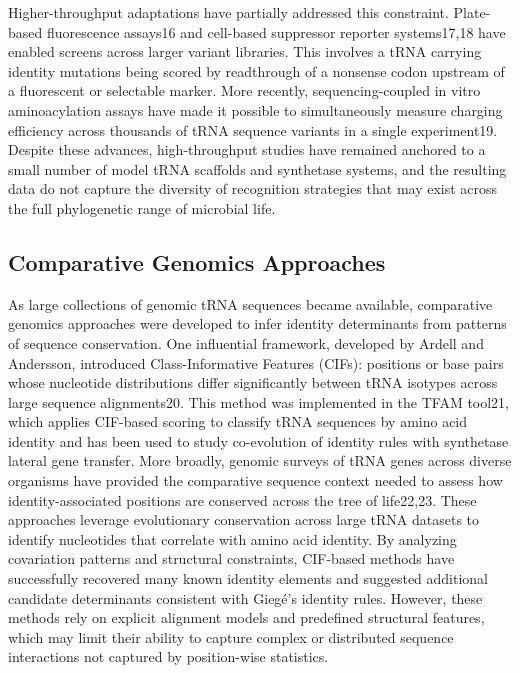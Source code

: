 \documentclass{article}
\begin{document}
Higher-throughput adaptations have partially addressed this constraint. Plate-based fluorescence assays16 and cell-based suppressor reporter systems17,18 have enabled screens across larger variant libraries. This involves a tRNA carrying identity mutations being scored by readthrough of a nonsense codon upstream of a fluorescent or selectable marker. More recently, sequencing-coupled in vitro aminoacylation assays have made it possible to simultaneously measure charging efficiency across thousands of tRNA sequence variants in a single experiment19. Despite these advances, high-throughput studies have remained anchored to a small number of model tRNA scaffolds and synthetase systems, and the resulting data do not capture the diversity of recognition strategies that may exist across the full phylogenetic range of microbial life.

\subsection{Comparative Genomics Approaches}

As large collections of genomic tRNA sequences became available, comparative genomics approaches were developed to infer identity determinants from patterns of sequence conservation. One influential framework, developed by Ardell and Andersson, introduced Class-Informative Features (CIFs): positions or base pairs whose nucleotide distributions differ significantly between tRNA isotypes across large sequence alignments20. This method was implemented in the TFAM tool21, which applies CIF-based scoring to classify tRNA sequences by amino acid identity and has been used to study co-evolution of identity rules with synthetase lateral gene transfer. More broadly, genomic surveys of tRNA genes across diverse organisms have provided the comparative sequence context needed to assess how identity-associated positions are conserved across the tree of life22,23.
These approaches leverage evolutionary conservation across large tRNA datasets to identify nucleotides that correlate with amino acid identity. By analyzing covariation patterns and structural constraints, CIF-based methods have successfully recovered many known identity elements and suggested additional candidate determinants consistent with Giegé's identity rules. However, these methods rely on explicit alignment models and predefined structural features, which may limit their ability to capture complex or distributed sequence interactions not captured by position-wise statistics.
\end{document}
